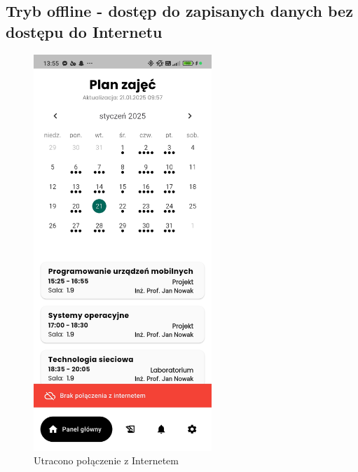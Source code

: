 \subsection{Tryb offline - dostęp do zapisanych danych bez dostępu do Internetu}
\begin{figure}[htp!]
	\centering
	\includegraphics[width=0.6\textwidth]{rys/app_disconnected.jpg}
	\caption{Utracono połączenie z Internetem}
	\label{rys:pushnotv2}
\end{figure}
\newpage

